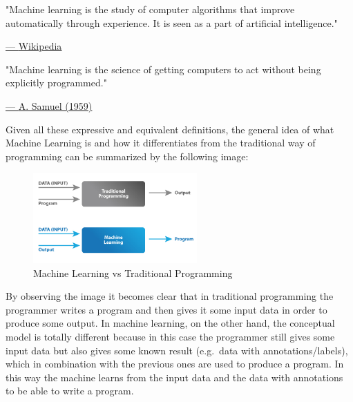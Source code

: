\vspace{5mm}

\begin{quoting}
    "Machine learning is the study of computer algorithms that improve
    automatically through experience. It is seen as a part of artificial
    intelligence."
\end{quoting}

\hspace{350pt}
\href{https://en.wikipedia.org/wiki/Machine_learning}{--- \underline{Wikipedia}}

\vspace{5mm}

\begin{quoting}
    "Machine learning is the science of getting computers to act without
    being explicitly programmed."
\end{quoting}

\hspace{317pt}
\href{https://en.wikipedia.org/wiki/Arthur_Samuel}{--- \underline{A. Samuel (1959)}}

\vspace{10mm}

Given all these expressive and equivalent definitions, the general idea
of what Machine Learning is and how it differentiates from the
traditional way of programming can be summarized by the following image:

\vspace{10mm}

\begin{figure}[h]
    \centering
    \includegraphics[width=0.56\textwidth]{../img/ML_vs_TP}
    \caption{Machine Learning vs Traditional Programming}
\end{figure}

\vspace{5mm}

By observing the image it becomes clear that in traditional programming
the programmer writes a program and then gives it some input data in
order to produce some output. In machine learning, on the other hand,
the conceptual model is totally different because in this case the
programmer still gives some input data but also gives some known result
(e.g.\ data with annotations/labels), which in combination with the
previous ones are used to produce a program. In this way the machine
learns from the input data and the data with annotations to be able to
write a program.

